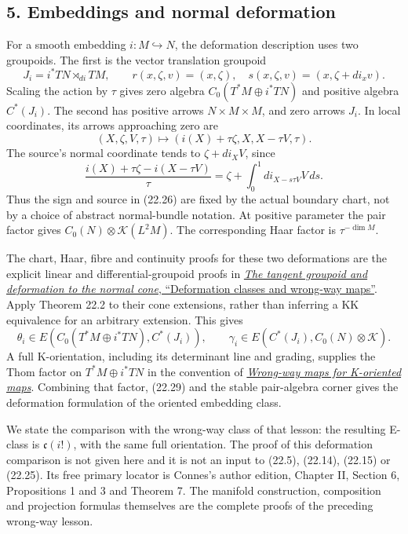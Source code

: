 \documentclass[
  11pt,
]{article}
\begin{document}
\subsection{5. Embeddings and normal
deformation}\label{embeddings-and-normal-deformation}

For a smooth embedding \(i:M\hookrightarrow N\), the deformation
description uses two groupoids. The first is the vector translation
groupoid \[
J_i=i^*TN\rtimes_{di}TM,\qquad
r(x,\zeta,v)=(x,\zeta),\quad
s(x,\zeta,v)=(x,\zeta+di_xv).
\tag{22.26}
\] Scaling the action by \(\tau\) gives zero algebra
\(C_0(T^*M\oplus i^*TN)\) and positive algebra \(C^*(J_i)\). The second
has positive arrows \(N\times M\times M\), and zero arrows \(J_i\). In
local coordinates, its arrows approaching zero are \[
(X,\zeta,V,\tau)\longmapsto
(i(X)+\tau\zeta,X,X-\tau V,\tau).
\tag{22.27}
\] The source's normal coordinate tends to \(\zeta+di_XV\), since \[
\frac{i(X)+\tau\zeta-i(X-\tau V)}{\tau}
=\zeta+\int_0^1di_{X-s\tau V}V\,ds.
\tag{22.28}
\] Thus the sign and source in (22.26) are fixed by the actual boundary
chart, not by a choice of abstract normal-bundle notation. At positive
parameter the pair factor gives \(C_0(N)\otimes\mathcal K(L^2M)\). The
corresponding Haar factor is \(\tau^{-\dim M}\).

The chart, Haar, fibre and continuity proofs for these two deformations
are the explicit linear and differential-groupoid proofs in
\href{../KT-CP/KT-CP-17.html}{\emph{The tangent groupoid and deformation
to the normal cone}, ``Deformation classes and wrong-way maps''}. Apply
Theorem 22.2 to their cone extensions, rather than inferring a KK
equivalence for an arbitrary extension. This gives \[
\theta_i\in E(C_0(T^*M\oplus i^*TN),C^*(J_i)),\qquad
\gamma_i\in E(C^*(J_i),C_0(N)\otimes\mathcal K).
\tag{22.29}
\] A full K-orientation, including its determinant line and grading,
supplies the Thom factor on \(T^*M\oplus i^*TN\) in the convention of
\href{KT-KK-16.html}{\emph{Wrong-way maps for K-oriented maps}}.
Combining that factor, (22.29) and the stable pair-algebra corner gives
the deformation formulation of the oriented embedding class.

We state the comparison with the wrong-way class of that lesson: the
resulting E-class is \(\mathfrak c(i!)\), with the same full
orientation. The proof of this deformation comparison is not given here
and it is not an input to (22.5), (22.14), (22.15) or (22.25). Its free
primary locator is Connes's author edition, Chapter II, Section 6,
Propositions 1 and 3 and Theorem 7. The manifold construction,
composition and projection formulas themselves are the complete proofs
of the preceding wrong-way lesson.
\end{document}
